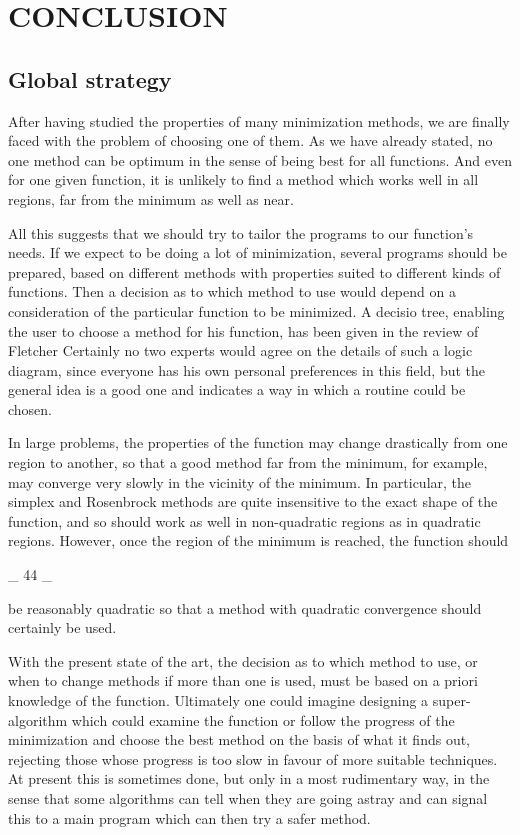  
 
\chapter{CONCLUSION}
\section{Global strategy}
     After having studied the properties of many minimization methods,
we are finally faced with the problem of choosing one of them.  As we
have already stated, no one method can be optimum in the sense of being
best for all functions.  And even for one given function, it is unlikely
to find a method which works well in all regions, far from the minimum
as well as near.
 
     All this suggests that we should try to tailor the programs to our
function's needs.  If we expect to be doing a lot of minimization,
several programs should be prepared, based on different methods with
properties suited to different kinds of functions.  Then a decision as
to which method to use would depend on a consideration of the particular
function to be minimized.  A decisio tree, enabling the user to choose
a method for his function, has been given in the review of Fletcher
Certainly no two experts would agree on the details of such a logic
diagram, since everyone has his own personal preferences in this field,
but the general idea is a good one and indicates a way in which a
routine could be chosen.
 
     In large problems, the properties of the function may change
drastically from one region to another, so that a good method far from
the minimum, for example, may converge very slowly in the vicinity of
the minimum.  In particular, the simplex and Rosenbrock methods are
quite insensitive to the exact shape of the function, and so should
work as well in non-quadratic regions as in quadratic regions.
However, once the region of the minimum is reached, the function should
 
                               _ 44 _
 
 
be reasonably quadratic so that a method with quadratic convergence
should certainly be used.
 
     With the present state of the art, the decision as to which method
to use, or when to change methods if more than one is used, must be
based on a priori knowledge of the function.  Ultimately one could
imagine designing a super-algorithm which could examine the function or
follow the progress of the minimization and choose the best method on
the basis of what it finds out, rejecting those whose progress is too
slow in favour of more suitable techniques.  At present this is sometimes
done, but only in a most rudimentary way, in the sense that some
algorithms can tell when they are going astray and can signal this to a
main program which can then try a safer method.
 
